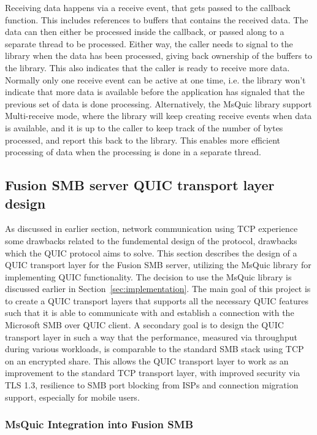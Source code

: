 \documentclass[english, 12pt, a4paper, elec, utf8, a-2b, online]{aaltothesis}
\begin{document}
Receiving data happens via a receive event, that gets passed to the callback function.
This includes references to buffers that contains the received data. The data can
then either be processed inside the callback, or passed along to a separate
thread to be processed. Either way, the caller needs to signal to the library when
the data has been processed, giving back ownership of the buffers to the library. This
also indicates that the caller is ready to receive more data. Normally only one receive
event can be active at one time, i.e. the library won't indicate that more data is
available before the application has signaled that the previous set of data is
done processing. Alternatively, the MsQuic library support Multi-receive mode,
where the library will keep creating receive events when data is available, and
it is up to the caller to keep track of the number of bytes processed, and report
this back to the library. This enables more efficient processing of data when the
processing is done in a separate thread\cite{msquic_docs}.

\subsection{Fusion SMB server QUIC transport layer design}

As discussed in earlier section, network communication using TCP experience
some drawbacks related to the fundemental design of the protocol, drawbacks
which the QUIC protocol aims to solve. This section describes the design of a
QUIC transport layer for the Fusion SMB server, utilizing the MsQuic library for
implementing QUIC functionality. The decision to use the MsQuic library is discussed
earlier in Section~\ref{sec:implementation}. The main goal of this project is to create
a QUIC transport layers that supports all the necessary QUIC features such that it
is able to communicate with and establish a connection with the Microsoft SMB over
QUIC client. A secondary goal is to design the QUIC transport layer in such a way
that the performance, measured via throughput during various workloads, is comparable
to the standard SMB stack using TCP on an encrypted share. This allows the QUIC transport
layer to work as an improvement to the standard TCP transport layer, with improved
security via TLS 1.3, resilience to SMB port blocking from ISPs and connection migration
support, especially for mobile users.

\subsubsection{MsQuic Integration into Fusion SMB}
\end{document}
